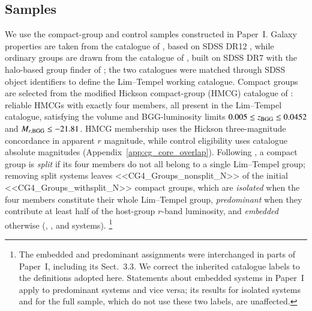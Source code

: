 \documentclass{aa}
\begin{document}
\subsection{Samples}\label{sec:samples}
We use the compact-group and control samples constructed in Paper~I. Galaxy properties are taken from the catalogue of \citet{Tempel+17}, based on SDSS DR12 \citep{York+00,Alam+15}, while ordinary groups are drawn from the catalogue of \citet{Lim+17}, built on SDSS DR7 \citep{Abazajian+09} with the halo-based group finder of \citet{Yang+07}; the two catalogues were matched through SDSS object identifiers to define the Lim--Tempel working catalogue. Compact groups are selected from the modified Hickson compact-group (HMCG) catalogue of \citet{DiazGimenez+18}: reliable HMCGs with exactly four members, all present in the Lim--Tempel catalogue, satisfying the volume and BGG-luminosity limits $0.005 \le z_{\rm BGG} \le 0.0452$ and $M_{r,\rm BGG}\leq -21.81$. HMCG membership uses the Hickson three-magnitude concordance in apparent $r$ magnitude, while control eligibility uses catalogue absolute magnitudes (Appendix~\ref{app:cg_core_overlap}). Following \citet{Zheng&Shen21}, a compact group is \emph{split} if its four members do not all belong to a single Lim--Tempel group; removing split systems leaves <<CG4_Groups_nonsplit_N>> of the initial <<CG4_Groups_withsplit_N>> compact groups, which are \emph{isolated} when the four members constitute their whole Lim--Tempel group, \emph{predominant} when they contribute at least half of the host-group $r$-band luminosity, and \emph{embedded} otherwise (\nGrIso, \nGrPre, and \nGrEmb{} systems).
\footnote{The embedded and predominant assignments were interchanged in parts of Paper~I, including its Sect.~3.3. We correct the inherited catalogue labels to the definitions adopted here. Statements about embedded systems in Paper~I apply to predominant systems and vice versa; its results for isolated systems and for the full sample, which do not use these two labels, are unaffected.}
\end{document}

